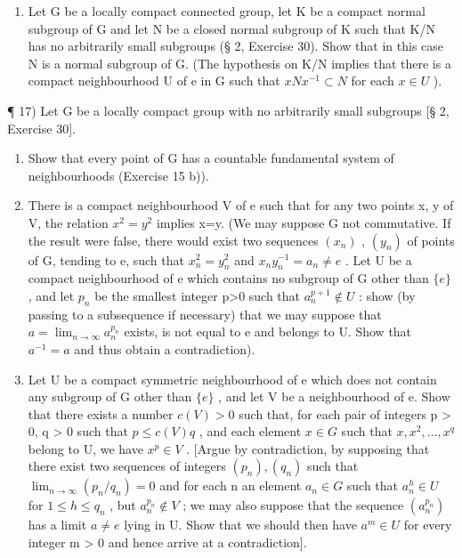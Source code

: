 \begin{enumerate}
\def\labelenumi{\arabic{enumi})}
\setcounter{enumi}{15}
\tightlist
\item
  Let G be a locally compact connected group, let K be a compact normal subgroup of G and let N be a closed normal subgroup of K such that K/N has no arbitrarily small subgroups (§ 2, Exercise 30). Show that in this case N is a normal subgroup of G. (The hypothesis on K/N implies that there is a compact neighbourhood U of e in G such that \(xNx^{-1} \subset N\) for each \(x \in U\) ).
\end{enumerate}

¶ 17) Let G be a locally compact group with no arbitrarily small subgroups {[}§ 2, Exercise 30{]}.

\begin{enumerate}
\def\labelenumi{\alph{enumi})}
\item
  Show that every point of G has a countable fundamental system of neighbourhoods (Exercise 15 b)).
\item
  There is a compact neighbourhood V of e such that for any two points x, y of V, the relation \(x^{2}=y^{2}\) implies x=y. (We may suppose G not commutative. If the result were false, there would exist two sequences \((x_{n})\) , \((y_{n})\) of points of G, tending to e, such that \(x_{n}^{2}=y_{n}^{2}\) and \(x_{n}y_{n}^{-1}=a_{n}\neq e\) . Let U be a compact neighbourhood of e which contains no subgroup of G other than \(\{e\}\) , and let \(p_{n}\) be the smallest integer p\textgreater0 such that \(a_{n}^{p+1}\notin U\) : show (by passing to a subsequence if necessary) that we may suppose that \(a=\lim_{n\to\infty}a_{n}^{p_{n}}\) exists, is not equal to e and belongs to U. Show that \(a^{-1}=a\) and thus obtain a contradiction).
\item
  Let U be a compact symmetric neighbourhood of e which does not contain any subgroup of G other than \(\{e\}\) , and let V be a neighbourhood of e. Show that there exists a number \(c(V) > 0\) such that, for each pair of integers p \textgreater{} 0, q \textgreater{} 0 such that \(p \leqslant c(V)q\) , and each element \(x \in G\) such that \(x, x^{2}, \ldots, x^{q}\) belong to U, we have \(x^{p} \in V\) . {[}Argue by contradiction, by supposing that there exist two sequences of integers \((p_{n}), (q_{n})\) such that \(\lim_{n \to \infty} (p_{n}/q_{n}) = 0\) and for each n an element \(a_{n} \in G\) such that \(a_{n}^{h} \in U\) for \(1 \leqslant h \leqslant q_{n}\) , but \(a_{n}^{p_{n}} \notin V\) ; we may also suppose that the sequence \((a_{n}^{p_{n}})\) has a limit \(a \neq e\) lying in U. Show that we should then have \(a^{m} \in U\) for every integer m \textgreater{} 0 and hence arrive at a contradiction{]}.
\end{enumerate}

